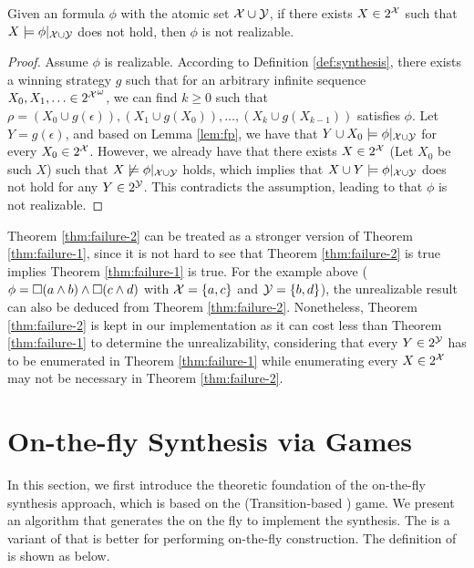 \begin{theorem}\label{thm:failure-2}
	Given an \ltlf formula $\phi$ with the atomic set $\mathcal{X}\cup \mathcal{Y}$, if there exists $X\in 2^{\mathcal{X}}$ such that $X\models \phi|_{\mathcal{X}\cup\mathcal{Y}}$ does not hold, then $\phi$ is not realizable. 
\end{theorem}
\begin{proof}
Assume $\phi$ is realizable. According to Definition \ref{def:synthesis}, there exists a winning strategy $g$ such that for an arbitrary infinite sequence $X_0,X_1,\ldots\in {2^{\mathcal{X}}}^{\omega}$, we can find $k\geq 0$ such that $\rho=(X_0\cup g(\epsilon)),(X_1\cup g(X_0)), \ldots, (X_k\cup g(X_{k-1}))$ satisfies $\phi$. Let $Y = g(\epsilon)$, and based on Lemma \ref{lem:fp}, we have that $Y\cup X_0\models \phi|_{\mathcal{X}\cup\mathcal{Y}}$ for every $X_0\in 2^{\mathcal{X}}$. However, we already have that there exists $X\in 2^{\mathcal{X}}$ (Let $X_0$ be such $X$) such that $X\not\models \phi|_{\mathcal{X}\cup\mathcal{Y}}$ holds, which implies that $X\cup Y\models \phi|_{\mathcal{X}\cup\mathcal{Y}}$ does not hold for any $Y\in 2^{\mathcal{Y}}$. This contradicts the assumption, leading to that $\phi$ is not realizable.
\end{proof}

Theorem \ref{thm:failure-2} can be treated as a stronger version of Theorem \ref{thm:failure-1}, since it is not hard to see that Theorem \ref{thm:failure-2} is true implies Theorem \ref{thm:failure-1} is true. For the example above ($\phi= \Box (a\wedge b)\wedge \Box (c\wedge d)$ with $\mathcal{X}=\{a,c\}$ and $\mathcal{Y}=\{b,d\}$), the unrealizable result can also be deduced from Theorem \ref{thm:failure-2}. Nonetheless, Theorem \ref{thm:failure-2} is kept in our implementation as it can cost less than Theorem \ref{thm:failure-1} to determine the unrealizability, considering that every $Y\in 2^{\mathcal{Y}}$ has to be enumerated in Theorem \ref{thm:failure-1} while enumerating every $X\in 2^{\mathcal{X}}$ may not be necessary in Theorem \ref{thm:failure-2}.


\section{On-the-fly Synthesis via \tdfa Games}
In this section, we first introduce the theoretic foundation of the on-the-fly \ltlf synthesis approach, which is based on the \tdfa (Transition-based \dfa) game. We present an algorithm that generates the \tdfa on the fly to implement the synthesis. The \tdfa is a variant of \dfa that is better for performing on-the-fly construction. The definition of \tdfa is shown as below. 
 
